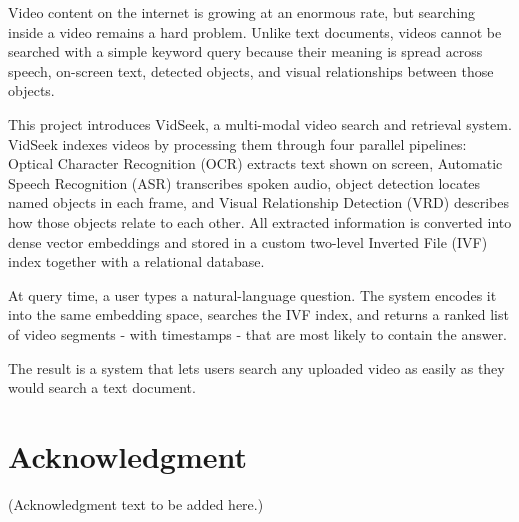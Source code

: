 \documentclass[12pt, a4paper]{report}
\begin{document}
Video content on the internet is growing at an enormous rate, but searching
inside a video remains a hard problem. Unlike text documents, videos cannot
be searched with a simple keyword query because their meaning is spread
across speech, on-screen text, detected objects, and visual relationships
between those objects.

This project introduces VidSeek, a multi-modal video search and retrieval
system. VidSeek indexes videos by processing them through four parallel
pipelines: Optical Character Recognition (OCR) extracts text shown on
screen, Automatic Speech Recognition (ASR) transcribes spoken audio,
object detection locates named objects in each frame, and Visual Relationship
Detection (VRD) describes how those objects relate to each other. All
extracted information is converted into dense vector embeddings and stored
in a custom two-level Inverted File (IVF) index together with a relational
database.

At query time, a user types a natural-language question. The system
encodes it into the same embedding space, searches the IVF index, and
returns a ranked list of video segments - with timestamps - that are most
likely to contain the answer.

The result is a system that lets users search any uploaded video as easily
as they would search a text document.

\newpage

\chapter*{Acknowledgment}
\thispagestyle{fancy}

(Acknowledgment text to be added here.)

\newpage

\tableofcontents
\newpage

\listoffigures
{}
\newpage

\listoftables
{}
\newpage

\end{document}
